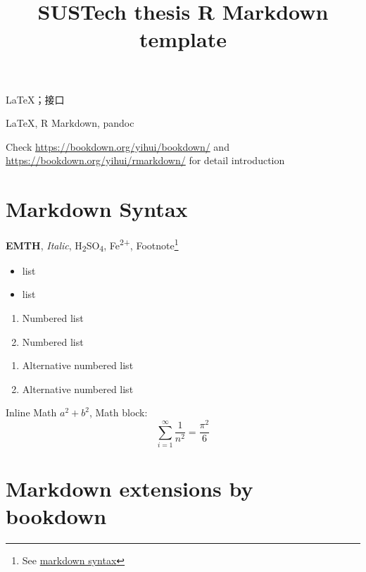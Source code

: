 \documentclass[AutoFakeBold,AutoFakeSlant,scheme=plain,degree=bachelor,zihao=-4]{sustechthesis}
\title{SUSTech thesis R Markdown template}
\author{
  }
\providecommand{\tightlist}{%
  \setlength{\itemsep}{0pt}\setlength{\parskip}{0pt}}
\theoremstyle{definition}
\theoremstyle{definition}
\theoremstyle{definition}
\theoremstyle{definition}
\theoremstyle{remark}
\begin{document}
\begin{中文摘要}{\LaTeX ；接口}
\lipsum[1]
\end{中文摘要}

\begin{英文摘要}{\LaTeX, R Markdown, pandoc}
\lipsum[1]
\end{英文摘要}



% 
\clearpage %

Check \url{https://bookdown.org/yihui/bookdown/} and \url{https://bookdown.org/yihui/rmarkdown/} for detail introduction

\hypertarget{markdown-syntax}{%
\section{Markdown Syntax}\label{markdown-syntax}}

\textbf{EMTH}, \emph{Italic}, H\textsubscript{2}SO\textsubscript{4}, Fe\textsuperscript{2+}, Footnote\footnote{See \href{https://bookdown.org/yihui/bookdown/markdown-syntax.html}{markdown syntax}}

\begin{itemize}
\tightlist
\item
  list
\item
  list
\end{itemize}

\begin{enumerate}
\def\labelenumi{\arabic{enumi}.}
\tightlist
\item
  Numbered list
\item
  Numbered list
\end{enumerate}

\begin{enumerate}
\def\labelenumi{\alph{enumi}.}
\tightlist
\item
  Alternative numbered list
\item
  Alternative numbered list
\end{enumerate}

Inline Math \(a^2+b^2\), Math block:
\[
\sum_{i=1}^{\infty}\frac{1}{n^2}=\frac{\pi^2}{6}
\]

\hypertarget{markdown-extensions-by-bookdown}{%
\section{Markdown extensions by bookdown}\label{markdown-extensions-by-bookdown}}
\end{document}
